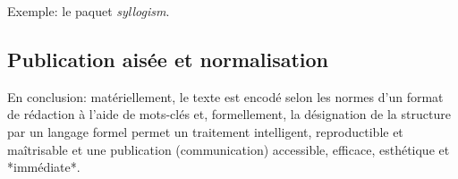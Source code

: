 \documentclass{article}
\newcommand\pkgname[1]{\emph{#1}}
\begin{document}
Exemple: le paquet \pkgname{syllogism}.

\subsection{Publication aisée et normalisation}

En conclusion: matériellement, le texte est encodé selon les normes d’un format de rédaction à l’aide de mots-clés et, formellement, la désignation de la structure par un langage formel permet un traitement intelligent, reproductible et maîtrisable et une publication (communication) accessible, efficace, esthétique et *immédiate*.
\end{document}
